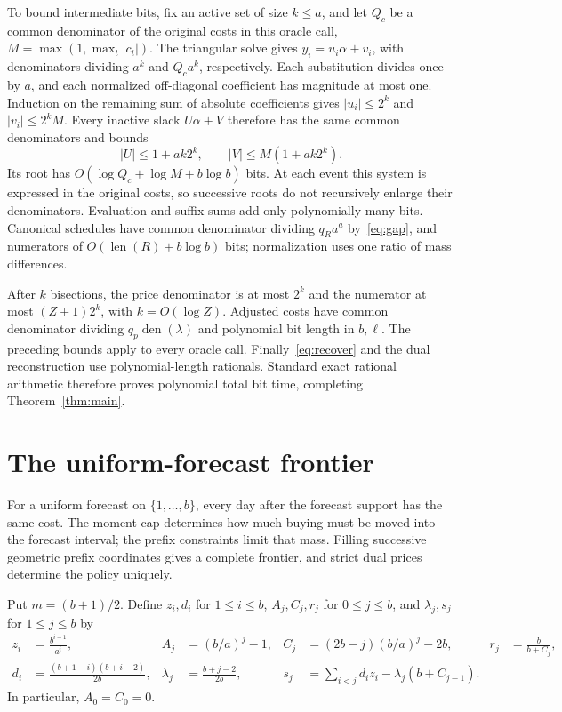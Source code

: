 \documentclass[manuscript,11pt,screen,nonacm]{acmart}
\begin{document}
To bound intermediate bits, fix an active set of size $k\le a$, and let
$Q_c$ be a common denominator of the original costs in this oracle call,
$M=\max(1,\max_t|c_t|)$. The triangular solve gives
$y_i=u_i\alpha+v_i$, with denominators dividing $a^k$ and $Q_ca^k$,
respectively. Each substitution divides once by $a$, and each normalized
off-diagonal coefficient has magnitude at most one. Induction on the
remaining sum of absolute coefficients gives $|u_i|\le2^k$ and
$|v_i|\le2^kM$. Every inactive slack $U\alpha+V$ therefore has the
same common denominators and bounds
\[
 |U|\le1+ak2^k,\qquad |V|\le M(1+ak2^k).
\]
Its root has $O(\log Q_c+\log M+b\log b)$ bits. At each event this
system is expressed in the original costs, so successive roots do not
recursively enlarge their denominators. Evaluation and suffix sums add
only polynomially many bits. Canonical schedules have common denominator
dividing $q_Ra^a$ by~\eqref{eq:gap}, and numerators of
$O(\operatorname{len}(R)+b\log b)$ bits; normalization uses one ratio
of mass differences.

After $k$ bisections, the price denominator is at most $2^k$ and the
numerator at most $(Z+1)2^k$, with $k=O(\log Z)$. Adjusted costs have
common denominator dividing $q_p\operatorname{den}(\lambda)$ and
polynomial bit length in $b,\ell$. The preceding bounds apply to every
oracle call. Finally~\eqref{eq:recover} and the dual reconstruction use
polynomial-length rationals. Standard exact rational arithmetic therefore
proves polynomial total bit time, completing Theorem~\ref{thm:main}.

\section{The uniform-forecast frontier}\label{sec:uniform}
For a uniform forecast on $\{1,\ldots,b\}$, every day after the forecast
support has the same cost. The moment cap determines how much buying must
be moved into the forecast interval; the prefix constraints limit that
mass. Filling successive geometric prefix coordinates gives a complete
frontier, and strict dual prices determine the policy uniquely.

Put $m=(b+1)/2$. Define $z_i,d_i$ for $1\le i\le b$,
$A_j,C_j,r_j$ for $0\le j\le b$, and $\lambda_j,s_j$ for
$1\le j\le b$ by
\begin{align}
 z_i&=\frac{b^{i-1}}{a^i},&
 A_j&=(b/a)^j-1,&
 C_j&=(2b-j)(b/a)^j-2b,&
 r_j&=\frac b{b+C_j},\label{eq:uniformdata}\\
 d_i&=\frac{(b+1-i)(b+i-2)}{2b},&
 \lambda_j&=\frac{b+j-2}{2b},&
 s_j&=\sum_{i<j}d_i z_i-\lambda_j(b+C_{j-1}).\label{eq:uniformslope}
\end{align}
In particular, $A_0=C_0=0$.
\end{document}
